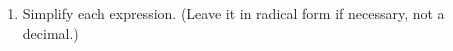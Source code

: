 \documentclass[12pt, twoside]{article}
\begin{document}
\begin{enumerate}
\item Simplify each expression. (Leave it in radical form if necessary, not a decimal.)
\begin{enumerate}
\end{enumerate}
\vspace{0.5cm}

\end{enumerate}
\end{document}
